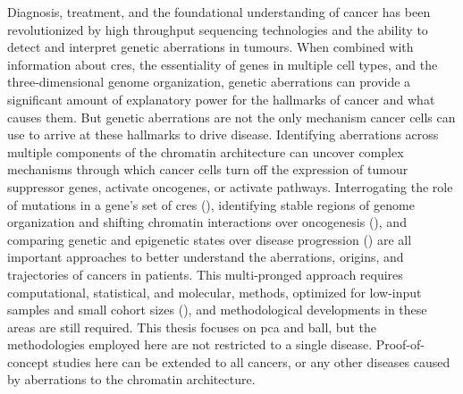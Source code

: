 Diagnosis, treatment, and the foundational understanding of cancer has been revolutionized by high throughput sequencing technologies and the ability to detect and interpret genetic aberrations in tumours.
When combined with information about \glspl{cre}, the essentiality of genes in multiple cell types, and the three-dimensional genome organization, genetic aberrations can provide a significant amount of explanatory power for the hallmarks of cancer and what causes them.
But genetic aberrations are not the only mechanism cancer cells can use to arrive at these hallmarks to drive disease.
Identifying aberrations across multiple components of the chromatin architecture can uncover complex mechanisms through which cancer cells turn off the expression of tumour suppressor genes, activate oncogenes, or activate pathways.
Interrogating the role of mutations in a gene's set of \glspl{cre} (), identifying stable regions of genome organization and shifting chromatin interactions over oncogenesis (), and comparing genetic and epigenetic states over disease progression () are all important approaches to better understand the aberrations, origins, and trajectories of cancers in patients.
This multi-pronged approach requires computational, statistical, and molecular, methods, optimized for low-input samples and small cohort sizes (), and methodological developments in these areas are still required.
This thesis focuses on \gls{pca} and \gls{ball}, but the methodologies employed here are not restricted to a single disease.
Proof-of-concept studies here can be extended to all cancers, or any other diseases caused by aberrations to the chromatin architecture.
